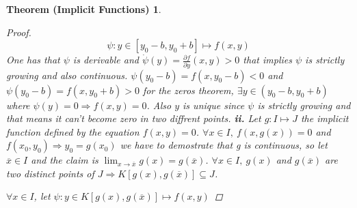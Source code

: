 \documentclass{article}
\newtheorem*{implicitfunctions}{Theorem (Implicit Functions)}
\begin{document}
\begin{implicitfunctions}
\begin{proof}
                    \begin{equation*}
                        \psi: y\in [y_0 - b, y_0 + b] \longmapsto f(x,y)
                    \end{equation*}
                    One has that $\psi$ is derivable and $\dot{\psi}(y) = \frac{\partial f}{\partial y}(x,y) >0$ that implies $\psi$ is strictly growing and also continuous. $\psi (y_0 - b) = f(x,y_0 - b) < 0$ and $\psi (y_0 - b) = f(x,y_0 + b) > 0$ for the zeros theorem, $\exists y \in (y_0 - b, y_0 + b)$ where $\psi(y) = 0 \Rightarrow f(x,y) = 0$. Also $y$ is unique since $\psi$ is strictly growing and that means it can't become zero in two diffrent points.
                    \textbf{ii.} Let $g: I \longmapsto J$ the implicit function defined by the equation $f(x,y) = 0$. $\forall x \in I, \ f(x,g(x)) = 0$ and $f(x_0,y_0) \Rightarrow y_0 = g(x_0)$ we have to demostrate that g is continuous, so let $\overline{x} \in I$ and the claim is $\lim_{x \to \overline{x}}g(x) = g(\overline{x})$. $\forall x \in I, \ g(x)$ and $g(\overline{x})$ are two distinct points of $J \Rightarrow K[g(x),g(\overline{x})] \subseteq J$. \\
                    \begin{center} 
                    \end{center}   
                    $\forall x \in I$, let $\psi : y\in K[g(x),g(\overline{x})] \longmapsto f(x,y)$       
                \end{proof}
            \end{implicitfunctions}
\end{document}
